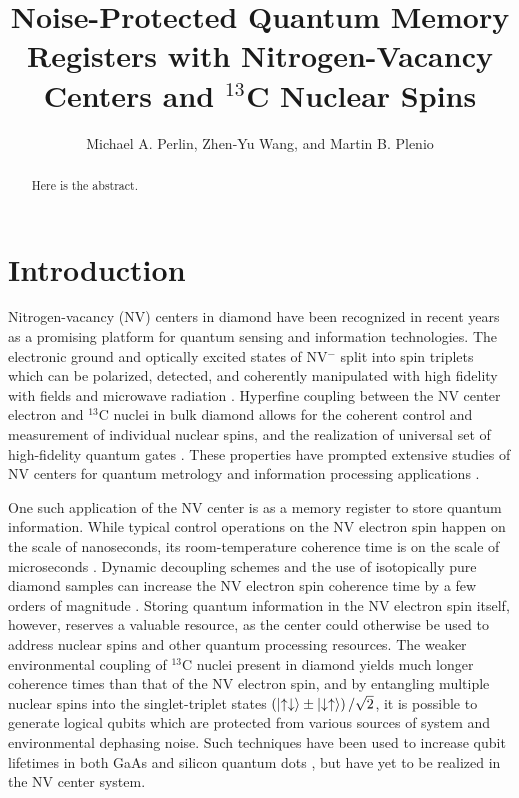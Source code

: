 \documentclass[twocolumn]{revtex4}
\newcommand{\p}[1]{\left(#1\right)} %
\renewcommand{\u}{\uparrow}
\renewcommand{\d}{\downarrow}
\begin{document}
\title{Noise-Protected Quantum Memory Registers with Nitrogen-Vacancy
  Centers and $^{13}$C Nuclear Spins}

\author{Michael A. Perlin, Zhen-Yu Wang, and Martin B. Plenio}


\begin{abstract}
  Here is the abstract.
\end{abstract}

\maketitle

\section{Introduction}

Nitrogen-vacancy (NV) centers in diamond have been recognized in
recent years as a promising platform for quantum sensing and
information technologies. The electronic ground and optically excited
states of NV$^-$ split into spin triplets which can be polarized,
detected, and coherently manipulated with high fidelity with fields
and microwave radiation \cite{dobrovitski2013quantum}. Hyperfine
coupling between the NV center electron and $^{13}$C nuclei in bulk
diamond allows for the coherent control and measurement of individual
nuclear spins, and the realization of universal set of high-fidelity
quantum gates \cite{dobrovitski2013quantum, casanova2016noise}. These
properties have prompted extensive studies of NV centers for quantum
metrology and information processing applications
\cite{mamin2013nanoscale, steinert2010high, wang2015positioning,
  chou2015optimal, childress2006fault, yao2012scalable}. %

One such application of the NV center is as a memory register to store
quantum information. While typical control operations on the NV
electron spin happen on the scale of nanoseconds, its room-temperature
coherence time is on the scale of microseconds
\cite{dobrovitski2013quantum}.  Dynamic decoupling schemes and the use
of isotopically pure diamond samples can increase the NV electron spin
coherence time by a few orders of magnitude
\cite{ryan2010robust}. Storing quantum information in the NV electron
spin itself, however, reserves a valuable resource, as the center
could otherwise be used to address nuclear spins and other quantum
processing resources. The weaker environmental coupling of $^{13}$C
nuclei present in diamond yields much longer coherence times than that
of the NV electron spin, and by entangling multiple nuclear spins into
the singlet-triplet states $\p{\ket{\u\d}\pm\ket{\d\u}}/\sqrt2$, it is
possible to generate logical qubits which are protected from various
sources of system and environmental dephasing noise. Such techniques
have been used to increase qubit lifetimes in both GaAs and silicon
quantum dots \cite{bluhm2011dephasing, maune2012coherent}, but have
yet to be realized in the NV center system.
\end{document}
